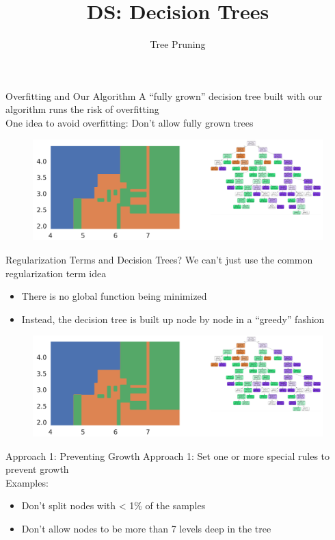 \documentclass[aspectratio=169]{../latex_main/tntbeamer}  %
\title[Tree Pruning]{DS: Decision Trees}
\subtitle{Tree Pruning}
\begin{document}
	
	\maketitle
	\begin{frame}{Overfitting and Our Algorithm}
	    A “fully grown” decision tree built with our algorithm runs the risk of overfitting\\
	    \bigskip
	    One idea to avoid overfitting: Don’t allow fully grown trees
	    \begin{figure}
	        \centering
	        \includegraphics[scale=.45]{Bild52}
	    \end{figure}
	\end{frame}
	
	\begin{frame}{Regularization Terms and Decision Trees?}
	    We can’t just use the common regularization term idea 
	    \begin{itemize}
	        \item There is no global function being minimized
	        \item Instead, the decision tree is built up node by node in a “greedy” fashion
	    \end{itemize}
	    \begin{figure}
	        \centering
	        \includegraphics[scale=.45]{Bild52}
	    \end{figure}
	\end{frame}
	
	
	\begin{frame}{Approach 1: Preventing Growth}
	    Approach 1: Set one or more special rules to prevent growth\\
	    \bigskip
	    Examples:
	    \begin{itemize}
	        \item Don’t split nodes with < 1\% of the samples  
	        \item Don’t allow nodes to be more than 7 levels deep in the tree
	    \end{itemize}
	\end{frame}
	
\end{document}
